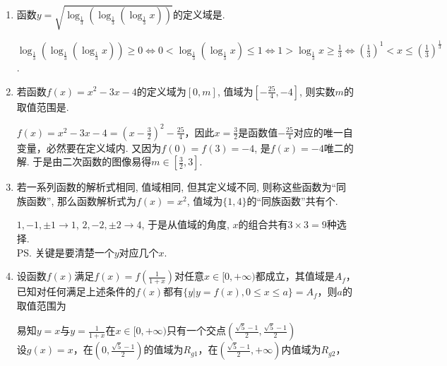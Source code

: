 \begin{enumerate}
    \begin{jieda}
        本质上还是在考察定义域.
    \end{jieda}
    \item 函数$y=\sqrt{\log_{\frac{1}{3}}\left(\log_{\frac{1}{3}}\left(\log_{\frac{1}{3}}x\right)\right)}$的定义域是\blkda{$\left(\frac{1}{3},\sqrt[3]{\frac{1}{3}}\right]$}.
    \begin{jieda}
    $\log_{\frac{1}{3}}\left(\log_{\frac{1}{3}}\left(\log_{\frac{1}{3}}x\right)\right)\geq 0\iff 0<\log_{\frac{1}{3}}\left(\log_{\frac{1}{3}}x\right)\leq 1
    \iff 1>\log_{\frac{1}{3}}x\geq\frac{1}{3}\iff (\frac{1}{3})^1<x\leq(\frac{1}{3})^{\frac{1}{3}}$. 
    \end{jieda}
            \item 若函数$f(x)=x^2-3x-4$的定义域为$[0,m]$, 值域为$\left[-\frac{25}{4},-4\right]$, 则实数$m$的取值范围是\blkda{$[\frac{3}{2},3]$}. 
        \begin{jieda}
        $f(x)=x^2-3x-4=(x-\frac{3}{2})^2-\frac{25}{4}$，因此$x = \frac{3}{2}$是函数值$-\frac{25}{4}$对应的唯一自变量，必然要在定义域内. 又因为$f(0)=f(3)=-4$, 是$f(x)=-4$唯二的解. 于是由二次函数的图像易得$m\in[\frac{3}{2},3]$. 
        \end{jieda}
        \item 若一系列函数的解析式相同, 值域相同, 但其定义域不同, 则称这些函数为``同族函数'', 
        那么函数解析式为$f(x)=x^2$, 值域为$\{1,4\}$的``同族函数''共有个.
        \begin{jieda}
        $1,-1,\pm1\to 1$, $2,-2,\pm2\to 4$, 于是从值域的角度, $x$的组合共有$3\times3=9$种选择. \\
        \ps 关键是要清楚一个$y$对应几个$x$.
        \end{jieda} 
        \item 设函数$f(x)$满足$f(x) = f(\frac{1}{1+x})$对任意$x \in [0, +\infty)$都成立，其值域是$A_f$，已知对任何满足上述条件的$f(x)$都有$\{y| y = f(x), 0 \leq x \leq a \} = A_f$，则$a$的取值范围为 \blkda[2]{$[\frac{\sqrt{5}-1}{2}, +\infty)$}
        \begin{jieda}
            易知$y = x$与$y = \frac{1}{1+x}$在$x \in [0, +\infty)$只有一个交点$(\frac{\sqrt{5}-1}{2}, \frac{\sqrt{5}-1}{2})$\\
            设$g(x) = x$，在$(0,\frac{\sqrt{5}-1}{2})$的值域为$R_{g1}$，在$(\frac{\sqrt{5}-1}{2}, +\infty)$内值域为$R_{g2}$，

\end{jieda}
\end{enumerate}
